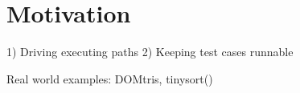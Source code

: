 \section{Motivation}
1) Driving executing paths
2) Keeping test cases runnable

Real world examples: DOMtris, tinysort()

